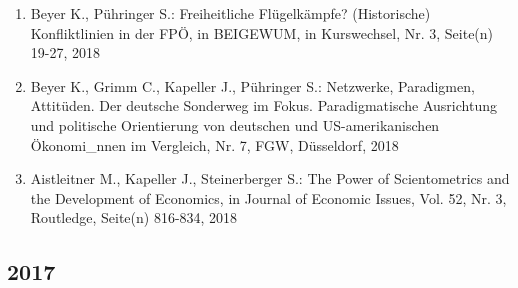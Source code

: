 \begin{enumerate}
	 \item Beyer K., Pühringer S.: Freiheitliche Flügelkämpfe? (Historische) Konfliktlinien in der FPÖ, in BEIGEWUM, in Kurswechsel, Nr. 3, Seite(n) 19-27, 2018
	 \item Beyer K., Grimm C., Kapeller J., Pühringer S.: Netzwerke, Paradigmen, Attitüden. Der deutsche Sonderweg im Fokus. Paradigmatische Ausrichtung und politische Orientierung von deutschen und US-amerikanischen Ökonomi_nnen im Vergleich, Nr. 7, FGW, Düsseldorf, 2018
	 \item Aistleitner M., Kapeller J., Steinerberger S.: The Power of Scientometrics and the Development of Economics, in Journal of Economic Issues, Vol. 52, Nr. 3, Routledge, Seite(n) 816-834, 2018
\end{enumerate}
\subsection*{2017}
